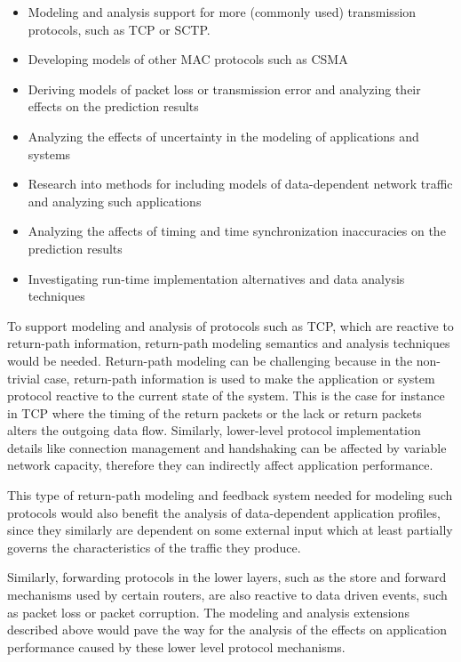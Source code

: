\begin{itemize}
  \item Modeling and analysis support for more (commonly used)
    transmission protocols, such as TCP or SCTP.
  \item Developing models of other MAC protocols such as CSMA
  \item Deriving models of packet loss or transmission error and
    analyzing their effects on the prediction results
  \item Analyzing the effects of uncertainty in the modeling of
    applications and systems
  \item Research into methods for including models of data-dependent
    network traffic and analyzing such applications
  \item Analyzing the affects of timing and time synchronization
    inaccuracies on the prediction results
  \item Investigating run-time implementation alternatives and data
    analysis techniques
\end{itemize}

To support modeling and analysis of protocols such as TCP, which are
reactive to return-path information, return-path modeling semantics
and analysis techniques would be needed.  Return-path modeling can be
challenging because in the non-trivial case, return-path information
is used to make the application or system protocol reactive to the
current state of the system.  This is the case for instance in TCP
where the timing of the return packets or the lack or return packets
alters the outgoing data flow.  Similarly, lower-level protocol
implementation details like connection management and handshaking can
be affected by variable network capacity, therefore they can
indirectly affect application performance.

This type of return-path modeling and feedback system needed for
modeling such protocols would also benefit the analysis of
data-dependent application profiles, since they similarly are
dependent on some external input which at least partially governs the
characteristics of the traffic they produce.

Similarly, forwarding protocols in the lower layers, such as the store
and forward mechanisms used by certain routers, are also reactive to
data driven events, such as packet loss or packet corruption.  The
modeling and analysis extensions described above would pave the way
for the analysis of the effects on application performance caused by
these lower level protocol mechanisms.

